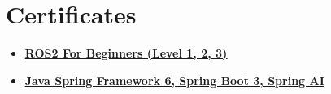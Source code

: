 \documentclass[letterpaper,11pt]{article}
\newcommand{\resumeItem}[1]{
  \item\small{
    {#1 \vspace{-2pt}}
  }
}
\newcommand{\resumeItemListStart}{\begin{itemize}}
\newcommand{\resumeItemListEnd}{\end{itemize}\vspace{-5pt}}
\begin{document}

\section{Certificates}
\resumeItemListStart
    \resumeItem
    {\textbf{\underline{\href{https://www.linkedin.com/in/bryananeyro/details/certifications/}{ROS2 For Beginners (Level 1, 2, 3)}}}}
\resumeItem
{\textbf{\underline{\href{https://www.linkedin.com/in/bryananeyro/details/certifications/}{Java Spring Framework 6, Spring Boot 3, Spring AI}}}}


    
\resumeItemListEnd

\end{document}

